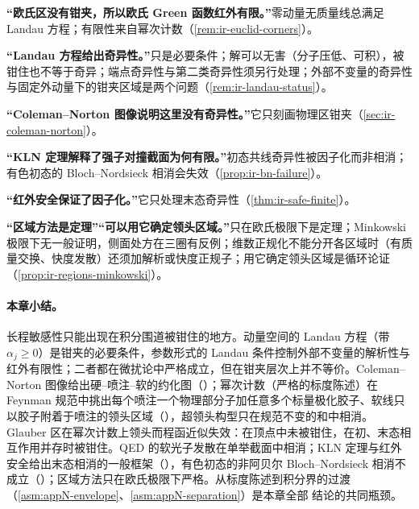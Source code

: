\begin{tcolorbox}[enhanced,breakable,title=常见误解,fonttitle=\bfseries,
  colback=gray!3!white,colframe=gray!55!black,boxrule=0.6pt,arc=2pt,
  left=5pt,right=5pt,top=3pt,bottom=3pt,before skip=6pt,after skip=6pt]
\textbf{“欧氏区没有钳夹，所以欧氏 Green 函数红外有限。”}零动量无质量线总满足 Landau 方程；有限性来自幂次计数（\cref{rem:ir-euclid-corners}）。\par
\textbf{“Landau 方程给出奇异性。”}只是必要条件；解可以无害（分子压低、可积），被钳住也不等于奇异；端点奇异性与第二类奇异性须另行处理；外部不变量的奇异性与固定外动量下的钳夹区域是两个问题（\cref{rem:ir-landau-status}）。\par
\textbf{“Coleman--Norton 图像说明这里没有奇异性。”}它只刻画物理区钳夹（\cref{sec:ir-coleman-norton}）。\par
\textbf{“KLN 定理解释了强子对撞截面为何有限。”}初态共线奇异性被因子化而非相消；有色初态的 Bloch--Nordsieck 相消会失效（\cref{prop:ir-bn-failure}）。\par
\textbf{“红外安全保证了因子化。”}它只处理末态奇异性（\cref{thm:ir-safe-finite}）。\par
\textbf{“区域方法是定理”“可以用它确定领头区域。”}只在欧氏极限下是定理；Minkowski 极限下无一般证明，侧面处方在三圈有反例；维数正规化不能分开各区域时（有质量交换、快度发散）还须加解析或快度正规子；用它确定领头区域是循环论证（\cref{prop:ir-regions-minkowski}）。
\end{tcolorbox}

\paragraph{本章小结。}
长程敏感性只能出现在积分围道被钳住的地方。动量空间的 Landau 方程（带 $\alpha_j\ge0$）是钳夹的必要条件，参数形式的 Landau 条件控制外部不变量的解析性与红外有限性；二者都在微扰论中严格成立，但在钳夹层次上并不等价。Coleman--Norton 图像给出硬--喷注--软的约化图（\tagA）；幂次计数（严格的标度陈述）在 Feynman 规范中挑出每个喷注一个物理部分子加任意多个标量极化胶子、软线只以胶子附着于喷注的领头区域（\tagA），超领头构型只在规范不变的和中相消。Glauber 区在幂次计数上领头而程函近似失效：在顶点中未被钳住，在初、末态相互作用并存时被钳住。QED 的软光子发散在单举截面中相消；KLN 定理与红外安全给出末态相消的一般框架（\tagA），有色初态的非阿贝尔 Bloch--Nordsieck 相消不成立（\tagV）；区域方法只在欧氏极限下严格。从标度陈述到积分界的过渡（\cref{asm:appN-envelope}、\cref{asm:appN-separation}）是本章全部 \tagA 结论的共同瓶颈。

